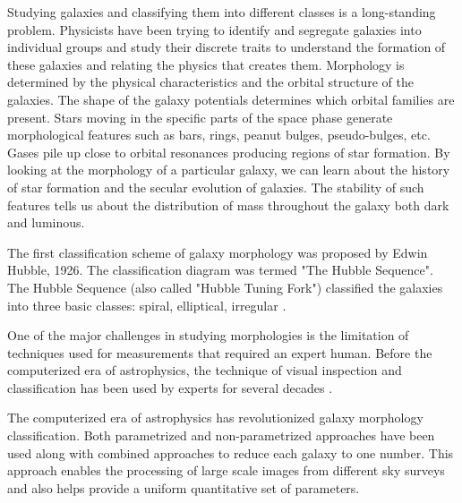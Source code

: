 \documentclass[fleqn,usenatbib]{mnras}
\begin{document}
\hspace{0.25 in}Studying galaxies and classifying them into different classes is a long-standing problem. Physicists have been trying to identify and segregate galaxies into individual groups and study their discrete traits to understand the formation of these galaxies and relating the physics that creates them. Morphology is determined by the physical characteristics and the orbital structure of the galaxies. The shape of the galaxy potentials determines which orbital families are present. Stars moving in the specific parts of the space phase generate morphological features such as bars, rings, peanut bulges, pseudo-bulges, etc. Gases pile up close to orbital resonances producing regions of star formation. By looking at the morphology of a particular galaxy, we can learn about the history of star formation and the secular evolution of galaxies. The stability of such features tells us about the distribution of mass throughout the galaxy both dark and luminous.

The first classification scheme of galaxy morphology was proposed by Edwin Hubble, 1926. The classification diagram was termed "The Hubble Sequence". The Hubble Sequence (also called "Hubble Tuning Fork") classified the galaxies into three basic classes: spiral, elliptical, irregular \citep{hubble1926extragalactic}.

One of the major challenges in studying morphologies is the limitation of techniques used for measurements that required an expert human. Before the computerized era of astrophysics, the technique of visual inspection and classification has been used by experts for several decades \citep{hubble1926extragalactic, 1959HDP....53..275D,Edmondson464,1976ApJ...206..883V}. 

The computerized era of astrophysics has revolutionized galaxy morphology classification. Both parametrized \citep{1968adga.book.....S, Cohen_2003} and non-parametrized approaches have been used along with combined approaches \citep{2003ApJS..147....1C,2004AJ....128..163L} to reduce each galaxy to one number. This approach enables the processing of large scale images from different sky surveys \citep{Djorgovski_2013} and also helps provide a uniform quantitative set of parameters.
\end{document}
